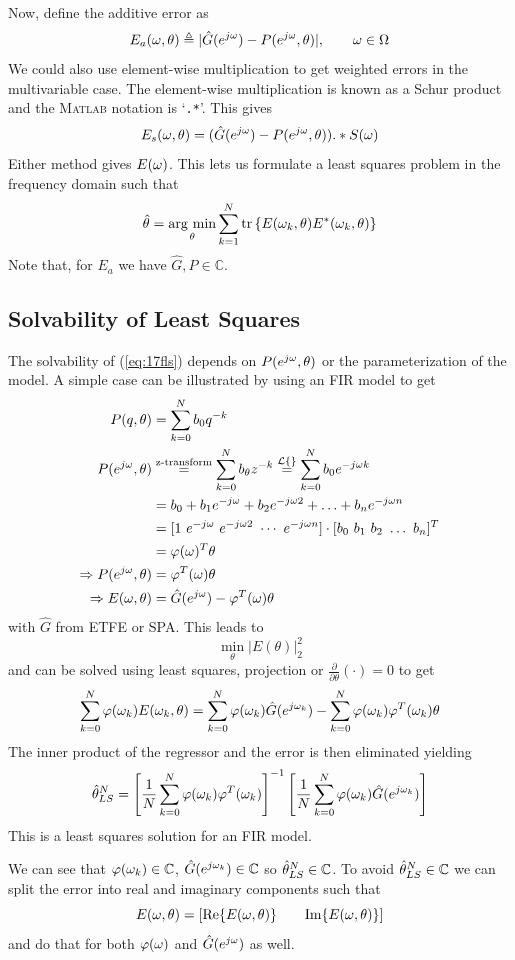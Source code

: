 Now, define the additive error as
$$E_a(\omega,\theta) \triangleq |\hat{G}(e^{j\omega})-P(e^{j\omega},\theta)|, \qquad \omega\in\Omega$$
We could also use element-wise multiplication to get weighted errors in the multivariable case. The element-wise multiplication is known as a Schur product and the \textsc{Matlab} notation is `\texttt{.*}'. This gives
$$E_s(\omega,\theta) = (\hat{G}(e^{j\omega})-P(e^{j\omega},\theta)).*S(\omega)$$
Either method gives $E(\omega)$. This lets us formulate a least squares problem in the frequency domain such that
\begin{align}
\label{eq:17fls}
\hat{\theta} = \mathop{\arg\,\min}\limits_\theta\sum_{k=1}^N\text{tr}\left\lbrace E(\omega_k,\theta)E^\ast(\omega_k,\theta)\right\rbrace
\end{align}
Note that, for $E_a$ we have $\hat{G},P\in\mathbb{C}$.

\subsection{Solvability of Least Squares}
The solvability of (\ref{eq:17fls}) depends on $P(e^{j\omega},\theta)$ or the parameterization of the model. A simple case can be illustrated by using an FIR model to get
\begin{align*}
P(q,\theta) &= \sum_{k=0}^N b_0q^{-k} \\
P(e^{j\omega},\theta) &\stackrel{\text{z-transform}}{=} \sum_{k=0}^N b_\theta z^{-k} \stackrel{\mathcal{L}\{\}}{=} \sum_{k=0}^N b_0e^{-j\omega k} \\
&= b_0 + b_1e^{-j\omega} + b_2e^{-j\omega 2} + \ldots + b_ne^{-j\omega n} \\
&= [1 ~ e^{-j\omega} ~ e^{-j\omega 2} ~ \cdots ~ e^{-j\omega n}] \cdot [b_0 ~ b_1 ~ b_2 ~ \ldots ~ b_n]^T \\
&= \varphi(\omega)^T\theta \\
\Rightarrow P(e^{j\omega},\theta) &= \varphi^T(\omega)\theta \\
\Rightarrow E(\omega,\theta) &= \hat{G}(e^{j\omega})-\varphi^T(\omega)\theta
\end{align*}
with $\hat{G}$ from ETFE or SPA. This leads to
$$\min_\theta|E(\theta)|_2^2$$
and can be solved using least squares, projection or $\tfrac{\partial}{\partial\theta}(\cdot)=0$ to get
$$\sum_{k=0}^N\varphi(\omega_k)E(\omega_k,\theta) = \sum_{k=0}^N\varphi(\omega_k)\hat{G}(e^{j\omega_k}) - \sum_{k=0}^N\varphi(\omega_k)\varphi^T(\omega_k)\theta$$
The inner product of the regressor and the error is then eliminated yielding
$$\hat{\theta}_{LS}^N = \left[\frac{1}{N}\sum_{k=0}^N\varphi(\omega_k)\varphi^T(\omega_k)\right]^{-1}\left[\frac{1}{N}\sum_{k=0}^N\varphi(\omega_k)\hat{G}(e^{j\omega_k})\right]$$
This is a least squares solution for an FIR model.

We can see that $\varphi(\omega_k)\in\mathbb{C}$, $\hat{G}(e^{j\omega_k})\in\mathbb{C}$ so $\hat{\theta}_{LS}^N\in\mathbb{C}$. To avoid $\hat{\theta}_{LS}^N\in\mathbb{C}$ we can split the error into real and imaginary components such that
$$E(\omega,\theta) = \left[\text{Re}\{E(\omega,\theta)\} \qquad \text{Im}\{E(\omega,\theta)\}\right]$$
and do that for both $\varphi(\omega)$ and $\hat{G}(e^{j\omega})$ as well.

